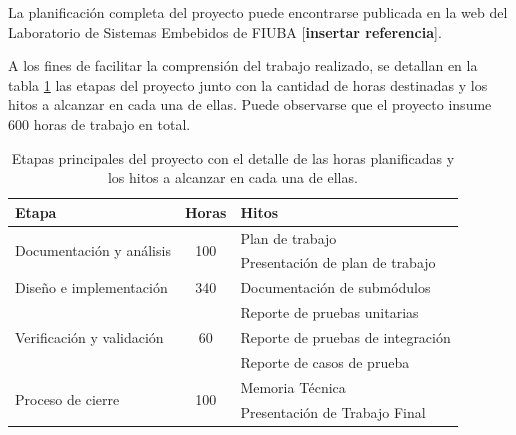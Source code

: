 La planificación completa del proyecto puede encontrarse publicada en la web del Laboratorio de Sistemas Embebidos de FIUBA [\textbf{insertar referencia}].

A los fines de facilitar la comprensión del trabajo realizado, se detallan en la tabla \ref{tab:planificacion} las etapas del proyecto junto con la cantidad de horas destinadas y los hitos a alcanzar en cada una de ellas.  Puede observarse que el proyecto insume 600 horas de trabajo en total.


\begin{table}[ht]
	\centering
	\caption[Diagrama \textit{Etapas del proyecto}.]{Etapas principales del proyecto con el detalle de las horas planificadas y los hitos a alcanzar en cada una de ellas.}
	\begin{tabular}{lcl}
	\toprule
	\textbf{Etapa}   & \textbf{Horas} & \textbf{Hitos} \\ 
	\midrule
	\multirow{2}{*}{Documentación y análisis}  & \multirow{2}{*}{100}                     & Plan de trabajo                          \\
                                             &                                          & Presentación de plan de trabajo  \vspace{5px}        \\ \hline
	Diseño e implementación                    & 340                                      & Documentación de submódulos  \vspace{5px}            \\ \hline 
	\multirow{3}{*}{Verificación y validación} & \multirow{3}{*}{60}                      & Reporte de pruebas unitarias             \\
	                                           &                                          & Reporte de pruebas de integración        \\
	                                           &                                          & Reporte de casos de prueba       \vspace{5px}        \\ \hline
	\multirow{2}{*}{Proceso de cierre}         & \multirow{2}{*}{100}                     & Memoria Técnica                          \\
	                                           &                                          & Presentación de Trabajo Final            \\ 
	\bottomrule
	\end{tabular}
	\label{tab:planificacion}
\end{table}



